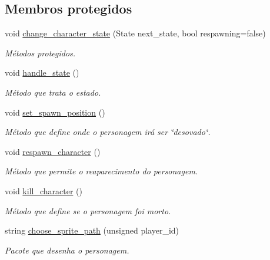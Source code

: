 \subsection*{Membros protegidos}
\begin{DoxyCompactItemize}
\item 
void \mbox{\hyperlink{classCharacter_a067f09af5430da58cc9698421fb84814}{change\+\_\+character\+\_\+state}} (State next\+\_\+state, bool respawning=false)
\begin{DoxyCompactList}\small\item\em Métodos protegidos. \end{DoxyCompactList}\item 
void \mbox{\hyperlink{classCharacter_a2edbbba1c9e07eece34c25f651e364d9}{handle\+\_\+state}} ()
\begin{DoxyCompactList}\small\item\em Método que trata o estado. \end{DoxyCompactList}\item 
void \mbox{\hyperlink{classCharacter_a75f825ad6509fa1601d2e2bc2ac04b3c}{set\+\_\+spawn\+\_\+position}} ()
\begin{DoxyCompactList}\small\item\em Método que define onde o personagem irá ser \char`\"{}desovado\char`\"{}. \end{DoxyCompactList}\item 
void \mbox{\hyperlink{classCharacter_afc90256ef2253670aee9def34f700247}{respawn\+\_\+character}} ()
\begin{DoxyCompactList}\small\item\em Método que permite o reaparecimento do personagem. \end{DoxyCompactList}\item 
void \mbox{\hyperlink{classCharacter_adb0d4f9c0ebbc0f9b19cb0a1f4b20df7}{kill\+\_\+character}} ()
\begin{DoxyCompactList}\small\item\em Método que define se o personagem foi morto. \end{DoxyCompactList}\item 
\mbox{\label{classCharacter_a5277e58a7a52a99a42bdb23c6295c7f1}} 
string \mbox{\hyperlink{classCharacter_a5277e58a7a52a99a42bdb23c6295c7f1}{choose\+\_\+sprite\+\_\+path}} (unsigned player\+\_\+id)
\begin{DoxyCompactList}\small\item\em Pacote que desenha o personagem. \end{DoxyCompactList}\item 

\end{DoxyCompactItemize}
